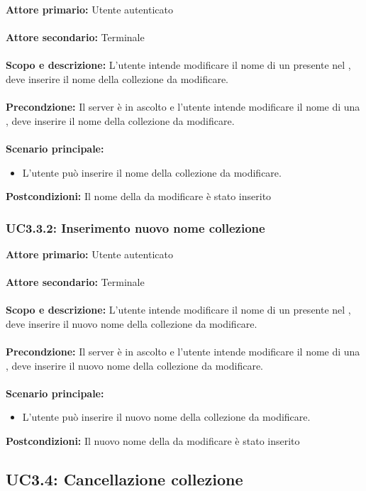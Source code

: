 \documentclass{scalatekids-article}
\begin{document}
\textbf{Attore primario:} Utente autenticato\\ \\
\textbf{Attore secondario:} Terminale\\ \\
\textbf{Scopo e descrizione:} L'utente intende modificare il nome di un  presente nel , deve inserire il nome della collezione da modificare.\\ \\
\textbf{Precondzione:} Il server è in ascolto e l'utente intende modificare il nome di una , deve inserire il nome della collezione da modificare.\\ \\
\textbf{Scenario principale:}
\begin{itemize}
\item L'utente può inserire il nome della collezione da modificare.
\end{itemize}
\textbf{Postcondizioni:} Il nome della  da modificare è stato inserito

\subsubsection{UC3.3.2: Inserimento nuovo nome collezione}

\textbf{Attore primario:} Utente autenticato\\ \\
\textbf{Attore secondario:} Terminale\\ \\
\textbf{Scopo e descrizione:} L'utente intende modificare il nome di un  presente nel , deve inserire il nuovo nome della collezione da modificare.\\ \\
\textbf{Precondzione:} Il server è in ascolto e l'utente intende modificare il nome di una , deve inserire il nuovo nome della collezione da modificare.\\ \\
\textbf{Scenario principale:}
\begin{itemize}
\item L'utente può inserire il nuovo nome della collezione da modificare.
\end{itemize}
\textbf{Postcondizioni:} Il nuovo nome della  da modificare è stato inserito

\subsection{UC3.4: Cancellazione collezione}
\end{document}
